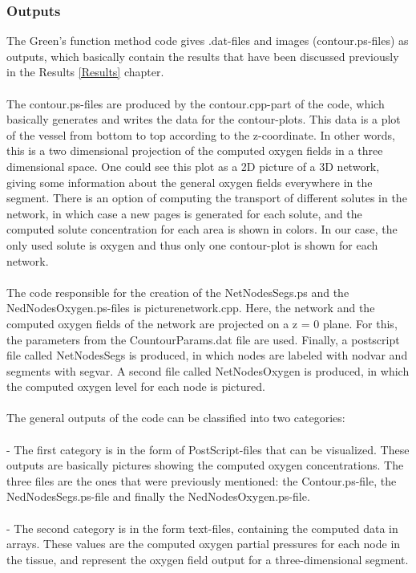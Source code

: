\subsubsection*{Outputs}
\label{Outputs}

The Green's function method code gives .dat-files and images (contour.ps-files) as outputs, which basically contain the results that have been discussed previously in the Results \ref{Results} chapter.
\\
\\The contour.ps-files are produced by the contour.cpp-part of the code, which basically generates and writes the data for the contour-plots. This data is a plot of the vessel from bottom to top according to the z-coordinate. In other words, this is a two dimensional projection of the computed oxygen fields in a three dimensional space. One could see this plot as a 2D picture of a 3D network, giving some information about the general oxygen fields everywhere in the segment. There is an option of computing the transport of different solutes in the network, in which case a new pages is generated for each solute, and the computed solute concentration for each area is shown in colors. In our case, the only used solute is oxygen and thus only one contour-plot is shown for each network.
\\
\\The code responsible for the creation of the NetNodesSegs.ps and the NedNodesOxygen.ps-files is picturenetwork.cpp. Here, the network and the computed oxygen fields of the network are projected on a z = 0 plane. For this, the parameters from the CountourParams.dat file are used. Finally, a postscript file called NetNodesSegs is produced, in which nodes are labeled with nodvar and segments with segvar. A second file called NetNodesOxygen is produced, in which the computed oxygen level for each node is pictured.
\\
\\The general outputs of the code can be classified into two categories:\\
\\- The first category is in the form of PostScript-files that can be visualized. These outputs are basically pictures showing the computed oxygen concentrations. The three files are the ones that were previously mentioned: the Contour.ps-file, the NedNodesSegs.ps-file and finally the NedNodesOxygen.ps-file.\\
\\- The second category is in the form text-files, containing the computed data in arrays. These values are the computed oxygen partial pressures for each node in the tissue, and represent the oxygen field output for a three-dimensional segment.
\\

